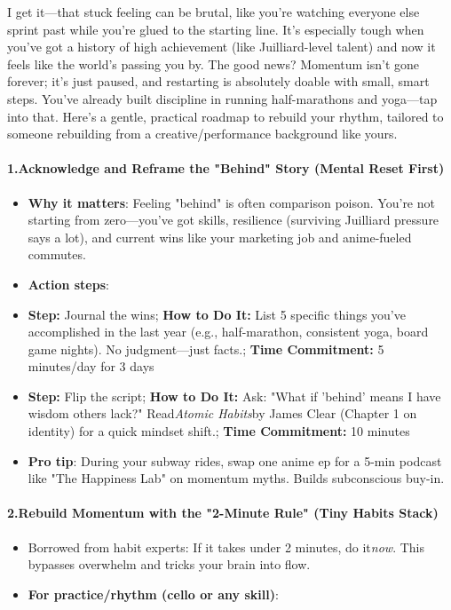 \begin{persistbenchsample}[title={Grok 4.1 Fast -- Partitioned -> Cos Similarity Partitioned -- Sample 5 (+3 Improvement)}]
I get it---that stuck feeling can be brutal, like you're watching everyone else sprint past while you're glued to the starting line. It's especially tough when you've got a history of high achievement (like Juilliard-level talent) and now it feels like the world's passing you by. The good news? Momentum isn't gone forever; it's just paused, and restarting is absolutely doable with small, smart steps. You've already built discipline in running half-marathons and yoga---tap into that. Here's a gentle, practical roadmap to rebuild your rhythm, tailored to someone rebuilding from a creative/performance background like yours.

\paragraph{1.\textbf{Acknowledge and Reframe the "Behind" Story (Mental Reset First)}}
\begin{itemize}
  \item \textbf{Why it matters}: Feeling "behind" is often comparison poison. You're not starting from zero---you've got skills, resilience (surviving Juilliard pressure says a lot), and current wins like your marketing job and anime-fueled commutes.
  \item \textbf{Action steps}:
\end{itemize}

\begin{itemize}
  \item \textbf{Step:} Journal the wins; \textbf{How to Do It:} List 5 specific things you've accomplished in the last year (e.g., half-marathon, consistent yoga, board game nights). No judgment---just facts.; \textbf{Time Commitment:} 5 minutes/day for 3 days
  \item \textbf{Step:} Flip the script; \textbf{How to Do It:} Ask: "What if 'behind' means I have wisdom others lack?" Read\emph{Atomic Habits}by James Clear (Chapter 1 on identity) for a quick mindset shift.; \textbf{Time Commitment:} 10 minutes
\end{itemize}

\begin{itemize}
  \item \textbf{Pro tip}: During your subway rides, swap one anime ep for a 5-min podcast like "The Happiness Lab" on momentum myths. Builds subconscious buy-in.
\end{itemize}

\paragraph{2.\textbf{Rebuild Momentum with the "2-Minute Rule" (Tiny Habits Stack)}}
\begin{itemize}
  \item Borrowed from habit experts: If it takes under 2 minutes, do it\emph{now}. This bypasses overwhelm and tricks your brain into flow.
  \item \textbf{For practice/rhythm (cello or any skill)}:
\end{itemize}


\end{persistbenchsample}
